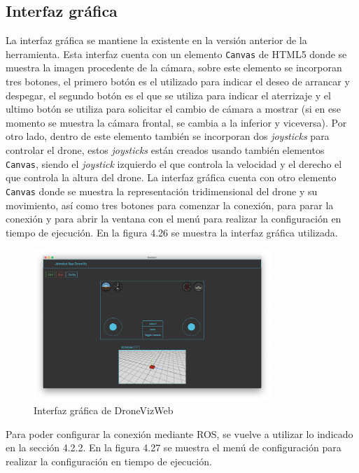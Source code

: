 \subsection{Interfaz gráfica}

La interfaz gráfica se mantiene la existente en la versión anterior de la herramienta. Esta interfaz cuenta con un elemento \texttt{Canvas} de HTML5 donde se muestra la imagen procedente de la cámara, sobre este elemento se incorporan tres botones, el primero botón es el utilizado para indicar el deseo de arrancar y despegar, el segundo botón es el que se utiliza para indicar el aterrizaje y el ultimo botón se utiliza para solicitar el cambio de cámara a mostrar (si en ese momento se muestra la cámara frontal, se cambia a la inferior y viceversa). Por otro lado, dentro de este elemento también se incorporan dos \textit{joysticks} para controlar el drone, estos \textit{joysticks} están creados usando también elementos \texttt{Canvas}, siendo el \textit{joystick} izquierdo el que controla la velocidad y el derecho el que controla la altura del drone. La interfaz gráfica cuenta con otro elemento \texttt{Canvas} donde se muestra la representación tridimensional del drone y su movimiento, así como tres botones para comenzar la conexión, para parar la conexión y para abrir la ventana con el menú para realizar la configuración en tiempo de ejecución. En la figura 4.26 se muestra la interfaz gráfica utilizada.

\begin{figure}[H]
  \begin{center}
    \includegraphics[width=0.8\textwidth]{figures/interfazdroneviz.png}
		\caption{Interfaz gráfica de DroneVizWeb}
		\label{fig.iterfazdroneviz}
		\end{center}
\end{figure}

Para poder configurar la conexión mediante ROS, se vuelve a utilizar lo indicado en la sección 4.2.2. En la figura 4.27 se muestra el menú de configuración para realizar la configuración en tiempo de ejecución.

